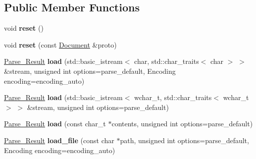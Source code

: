 \subsection*{Public Member Functions}
\begin{DoxyCompactItemize}
\item 
\hypertarget{classphys_1_1xml_1_1Document_aadb3e68da9cf95b1193f915136f9a7e5}{
void {\bfseries reset} ()}
\label{dd/d44/classphys_1_1xml_1_1Document_aadb3e68da9cf95b1193f915136f9a7e5}

\item 
\hypertarget{classphys_1_1xml_1_1Document_a8d79b0e71457e8a64f331fd4cc117a86}{
void {\bfseries reset} (const \hyperlink{classphys_1_1xml_1_1Document}{Document} \&proto)}
\label{dd/d44/classphys_1_1xml_1_1Document_a8d79b0e71457e8a64f331fd4cc117a86}

\item 
\hypertarget{classphys_1_1xml_1_1Document_acf58c2f5b8aa66b79c04ac9ff11b6aaa}{
\hyperlink{structphys_1_1xml_1_1Parse__Result}{Parse\_\-Result} {\bfseries load} (std::basic\_\-istream$<$ char, std::char\_\-traits$<$ char $>$ $>$ \&stream, unsigned int options=parse\_\-default, Encoding encoding=encoding\_\-auto)}
\label{dd/d44/classphys_1_1xml_1_1Document_acf58c2f5b8aa66b79c04ac9ff11b6aaa}

\item 
\hypertarget{classphys_1_1xml_1_1Document_a32e1cce6b47e35566dfab0a674d315a0}{
\hyperlink{structphys_1_1xml_1_1Parse__Result}{Parse\_\-Result} {\bfseries load} (std::basic\_\-istream$<$ wchar\_\-t, std::char\_\-traits$<$ wchar\_\-t $>$ $>$ \&stream, unsigned int options=parse\_\-default)}
\label{dd/d44/classphys_1_1xml_1_1Document_a32e1cce6b47e35566dfab0a674d315a0}

\item 
\hypertarget{classphys_1_1xml_1_1Document_a0828f3793a11e45c2ab04310c293ea81}{
\hyperlink{structphys_1_1xml_1_1Parse__Result}{Parse\_\-Result} {\bfseries load} (const char\_\-t $\ast$contents, unsigned int options=parse\_\-default)}
\label{dd/d44/classphys_1_1xml_1_1Document_a0828f3793a11e45c2ab04310c293ea81}

\item 
\hypertarget{classphys_1_1xml_1_1Document_aeeaf869cbec9a7593759abed1a9a1a4f}{
\hyperlink{structphys_1_1xml_1_1Parse__Result}{Parse\_\-Result} {\bfseries load\_\-file} (const char $\ast$path, unsigned int options=parse\_\-default, Encoding encoding=encoding\_\-auto)}
\label{dd/d44/classphys_1_1xml_1_1Document_aeeaf869cbec9a7593759abed1a9a1a4f}


\end{DoxyCompactItemize}
